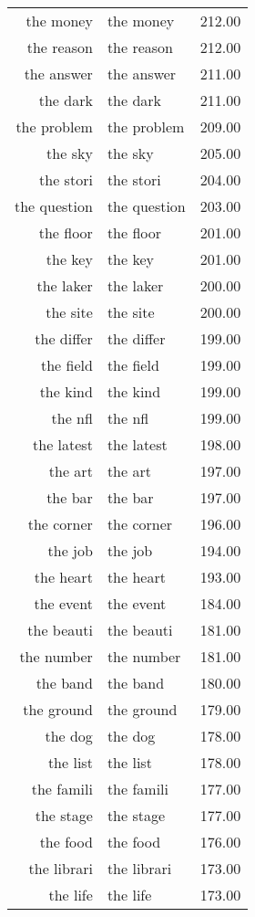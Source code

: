 \begin{table}[ht]
\begin{tabular}{rlr}
  the money & the money & 212.00 \\ 
  the reason & the reason & 212.00 \\ 
  the answer & the answer & 211.00 \\ 
  the dark & the dark & 211.00 \\ 
  the problem & the problem & 209.00 \\ 
  the sky & the sky & 205.00 \\ 
  the stori & the stori & 204.00 \\ 
  the question & the question & 203.00 \\ 
  the floor & the floor & 201.00 \\ 
  the key & the key & 201.00 \\ 
  the laker & the laker & 200.00 \\ 
  the site & the site & 200.00 \\ 
  the differ & the differ & 199.00 \\ 
  the field & the field & 199.00 \\ 
  the kind & the kind & 199.00 \\ 
  the nfl & the nfl & 199.00 \\ 
  the latest & the latest & 198.00 \\ 
  the art & the art & 197.00 \\ 
  the bar & the bar & 197.00 \\ 
  the corner & the corner & 196.00 \\ 
  the job & the job & 194.00 \\ 
  the heart & the heart & 193.00 \\ 
  the event & the event & 184.00 \\ 
  the beauti & the beauti & 181.00 \\ 
  the number & the number & 181.00 \\ 
  the band & the band & 180.00 \\ 
  the ground & the ground & 179.00 \\ 
  the dog & the dog & 178.00 \\ 
  the list & the list & 178.00 \\ 
  the famili & the famili & 177.00 \\ 
  the stage & the stage & 177.00 \\ 
  the food & the food & 176.00 \\ 
  the librari & the librari & 173.00 \\ 
  the life & the life & 173.00 \\ 

\end{tabular}
\end{table}
